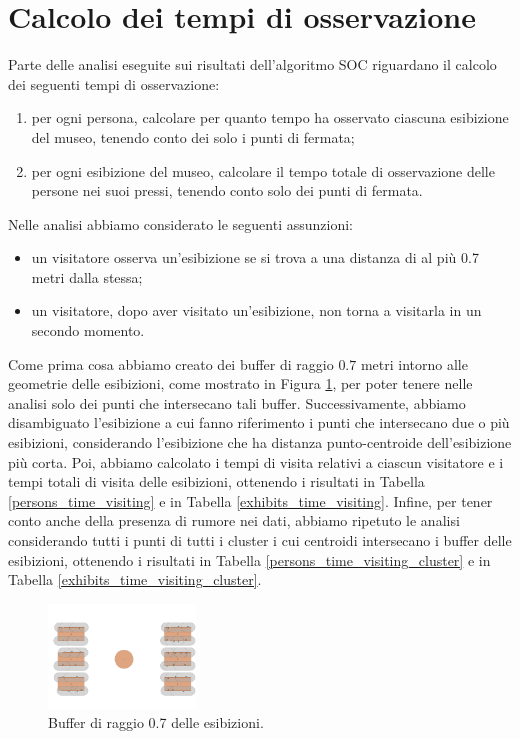 \documentclass[12pt]{article}
\begin{document}
\section{Calcolo dei tempi di osservazione}\label{calcolo_tempi}
Parte delle analisi eseguite sui risultati dell'algoritmo SOC riguardano il calcolo dei seguenti tempi di osservazione:
\begin{enumerate}
    \item per ogni persona, calcolare per quanto tempo ha osservato ciascuna esibizione del museo, tenendo conto dei solo i punti di fermata;
    \item per ogni esibizione del museo, calcolare il tempo totale di osservazione delle persone nei suoi pressi, tenendo conto solo dei punti di fermata.
\end{enumerate}
Nelle analisi abbiamo considerato le seguenti assunzioni:
\begin{itemize}
    \item un visitatore osserva un'esibizione se si trova a una distanza di al più 0.7 metri dalla stessa;
    \item un visitatore, dopo aver visitato un'esibizione, non torna a visitarla in un secondo momento.
\end{itemize}
Come prima cosa abbiamo creato dei buffer di raggio $0.7$ metri intorno alle geometrie delle esibizioni, come mostrato in Figura \ref{tables_with_exhibits_buffer}, per poter tenere nelle analisi solo dei punti che intersecano tali buffer.
Successivamente, abbiamo disambiguato l'esibizione a cui fanno riferimento i punti che intersecano due o più esibizioni, considerando l'esibizione che ha distanza punto-centroide dell'esibizione più corta.
Poi, abbiamo calcolato i tempi di visita relativi a ciascun visitatore e i tempi totali di visita delle esibizioni, ottenendo i risultati in Tabella \ref{persons_time_visiting} e in Tabella \ref{exhibits_time_visiting}.
Infine, per tener conto anche della presenza di rumore nei dati, abbiamo ripetuto le analisi considerando tutti i punti di tutti i cluster i cui centroidi intersecano i buffer delle esibizioni, ottenendo i risultati in Tabella \ref{persons_time_visiting_cluster} e in Tabella \ref{exhibits_time_visiting_cluster}.

\begin{figure}[htb!]
    \centering
    \includegraphics[width=0.35\textwidth]{images/tables_with_exhibits_buffer.png}
    \caption{Buffer di raggio 0.7 delle esibizioni.}
    \label{tables_with_exhibits_buffer}
\end{figure}
\end{document}

